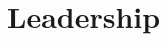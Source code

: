 \documentclass[10pt, a4paper]{article}
\newcommand{\years}[1]{\marginnote{\normalsize #1}}
\begin{document}








\section*{Leadership}
\end{document}

